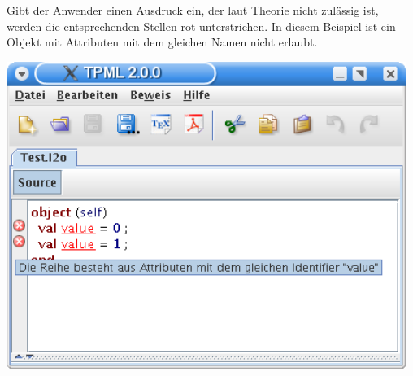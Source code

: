 {
  Gibt der Anwender einen Ausdruck ein, der laut Theorie nicht zulässig ist, werden die entsprechenden
  Stellen rot unterstrichen. In diesem Beispiel ist ein Objekt mit Attributen mit dem gleichen Namen
  nicht erlaubt.
  \begin{center}
    \includegraphics[height=10cm]{images/parser_error.png}
  \end{center}
}